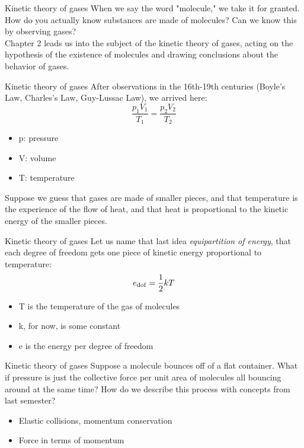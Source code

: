 \documentclass{beamer}
\begin{document}
\begin{frame}{Kinetic theory of gases}
When we say the word "molecule," we take it for granted.  How do you actually know substances are made of molecules?  Can we know this by observing gases? \\ \vspace{1cm}
Chapter 2 leads us into the subject of the \alert{kinetic theory of gases}, acting on the hypothesis of the existence of molecules and drawing conclusions about the behavior of gases.
\end{frame}

\begin{frame}{Kinetic theory of gases}
After observations in the 16th-19th centuries (Boyle's Law, Charles's Law, Guy-Lussac Law), we arrived here: \\ \vspace{1cm}
\begin{equation}
\frac{p_1 V_1}{T_1} = \frac{p_2 V_2}{T_2}
\end{equation}
\begin{itemize}
\item p: pressure
\item V: volume
\item T: temperature
\end{itemize}
Suppose we guess that gases are made of smaller pieces, and that temperature is the experience of the flow of heat, and that heat is proportional to the kinetic energy of the smaller pieces.
\end{frame}

\begin{frame}{Kinetic theory of gases}
Let us name that last idea \textit{equipartition of energy}, that each \alert{degree of freedom} gets one piece of kinetic energy proportional to temperature:
\begin{equation}
e_{\rm dof} = \frac{1}{2}kT
\end{equation}
\begin{itemize}
\item T is the temperature of the gas of molecules
\item k, for now, is some constant
\item e is the energy per degree of freedom
\end{itemize}
\end{frame}

\begin{frame}{Kinetic theory of gases}
Suppose a molecule bounces off of a flat container.  What if pressure is just the collective force per unit area of molecules all bouncing around at the same time?  How do we describe this process with concepts from last semester?
\begin{itemize}
\item Elastic collisions, momentum conservation
\item Force in terms of momentum
\end{itemize}
\end{frame}
\end{document}
